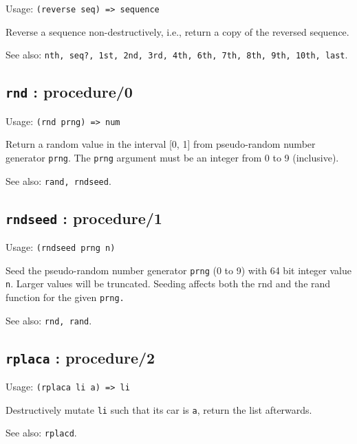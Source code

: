 \documentclass[
]{article}
\newcommand{\passthrough}[1]{#1}
\begin{document}
Usage: \passthrough{\lstinline!(reverse seq) => sequence!}

Reverse a sequence non-destructively, i.e., return a copy of the
reversed sequence.

See also:
\passthrough{\lstinline!nth, seq?, 1st, 2nd, 3rd, 4th, 6th, 7th, 8th, 9th, 10th, last!}.

\hypertarget{rnd-procedure0-1}{%
\subsection{\texorpdfstring{\texttt{rnd} :
procedure/0}{rnd : procedure/0}}\label{rnd-procedure0-1}}

Usage: \passthrough{\lstinline!(rnd prng) => num!}

Return a random value in the interval {[}0, 1{]} from pseudo-random
number generator \passthrough{\lstinline!prng!}. The
\passthrough{\lstinline!prng!} argument must be an integer from 0 to 9
(inclusive).

See also: \passthrough{\lstinline!rand, rndseed!}.

\hypertarget{rndseed-procedure1-1}{%
\subsection{\texorpdfstring{\texttt{rndseed} :
procedure/1}{rndseed : procedure/1}}\label{rndseed-procedure1-1}}

Usage: \passthrough{\lstinline!(rndseed prng n)!}

Seed the pseudo-random number generator \passthrough{\lstinline!prng!}
(0 to 9) with 64 bit integer value \passthrough{\lstinline!n!}. Larger
values will be truncated. Seeding affects both the rnd and the rand
function for the given \passthrough{\lstinline!prng.!}

See also: \passthrough{\lstinline!rnd, rand!}.

\hypertarget{rplaca-procedure2-1}{%
\subsection{\texorpdfstring{\texttt{rplaca} :
procedure/2}{rplaca : procedure/2}}\label{rplaca-procedure2-1}}

Usage: \passthrough{\lstinline!(rplaca li a) => li!}

Destructively mutate \passthrough{\lstinline!li!} such that its car is
\passthrough{\lstinline!a!}, return the list afterwards.

See also: \passthrough{\lstinline!rplacd!}.
\end{document}
